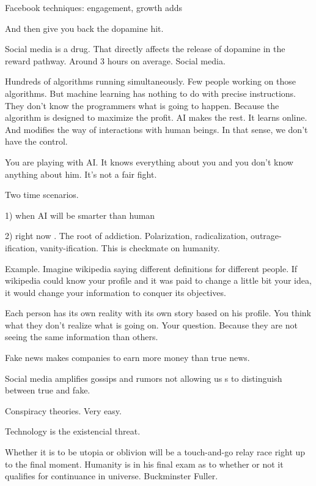   
 
  
 Facebook techniques: engagement, growth adds
  
  And then give you back the dopamine hit. 
  
 Social media is a drug. 
 That directly affects the release of dopamine in the reward pathway. 
 Around 3 hours on average. Social media. 
  
  
 Hundreds of algorithms running simultaneously. 
 Few people working on those algorithms. 
 But machine learning has nothing to do with precise  instructions. 
 They don't know the programmers what is going to happen. 
 Because the algorithm is designed to maximize the profit. 
 AI makes the rest. It learns online. And modifies the 
 way of interactions with human beings. 
 In that sense, we don't have the control. 
  
 You are playing with AI. 
 It knows everything about you and you don't know anything about him.  
 It's not a fair fight. 
  
 Two time scenarios. 
  
  1) when AI will be smarter than human
  
  2) right now . The root of addiction.
   Polarization, radicalization, outrage-ification, vanity-ification. 
  This is checkmate on humanity. 
  
  Example. Imagine wikipedia saying different definitions for different people. If wikipedia could know your profile and it was paid to 
  change 
  a little bit your idea, it would change your information to conquer its objectives. 
  
  Each person has its own reality with its own story based on his profile. 
  You think what they don't realize what is going on. Your question. Because they are not seeing the same information than others. 
  
  Fake news makes companies to earn more money than true news. 
  
  Social media amplifies gossips and rumors not allowing us s to distinguish between true and fake. 
  
  Conspiracy theories. Very easy. 
  
  Technology is the existencial threat. 
  
  Whether it is to be utopia or oblivion will be a touch-and-go relay race right up to the final moment. Humanity is in his final exam as to 
  whether or not it qualifies for continuance in universe. 
  Buckminster Fuller. 
  
